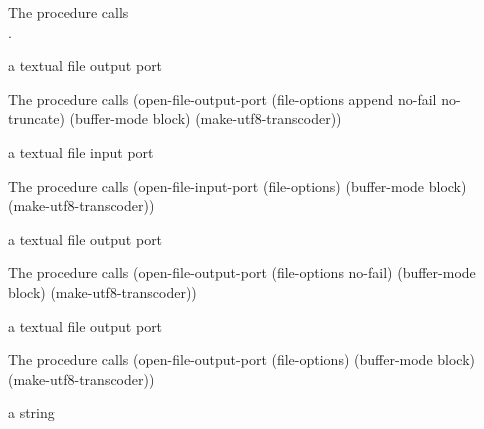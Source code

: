 The  procedure calls\\
.

\begin{procedure}
\end{procedure}
\returns{} a textual file output port

The  procedure calls
\codebegin
(open-file-output-port 
  (file-options append no-fail no-truncate)
  (buffer-mode block)
  (make-utf8-transcoder))
\codeend

\begin{procedure}
\end{procedure}
\returns{} a textual file input port

The  procedure calls
\codebegin
(open-file-input-port 
  (file-options)
  (buffer-mode block)
  (make-utf8-transcoder))
\codeend

\begin{procedure}
\end{procedure}
\returns{} a textual file output port

The  procedure calls
\codebegin
(open-file-output-port 
  (file-options no-fail)
  (buffer-mode block)
  (make-utf8-transcoder))
\codeend

\begin{procedure}
\end{procedure}
\returns{} a textual file output port

The  procedure calls
\codebegin
(open-file-output-port 
  (file-options)
  (buffer-mode block)
  (make-utf8-transcoder))
\codeend

\begin{procedure}
\end{procedure}
\returns{} a string

